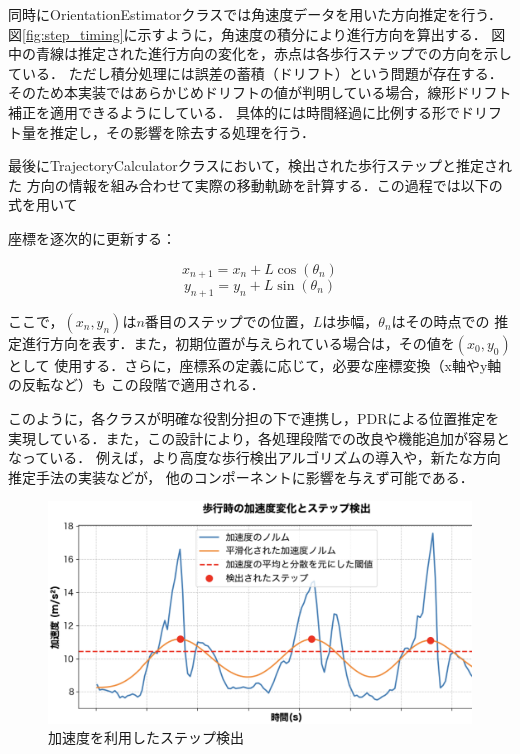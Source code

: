 同時にOrientationEstimatorクラスでは角速度データを用いた方向推定を行う．
図\ref{fig:step_timing}に示すように，角速度の積分により進行方向を算出する．
図中の青線は推定された進行方向の変化を，赤点は各歩行ステップでの方向を示している．
ただし積分処理には誤差の蓄積（ドリフト）という問題が存在する．
そのため本実装ではあらかじめドリフトの値が判明している場合，線形ドリフト補正を適用できるようにしている．
具体的には時間経過に比例する形でドリフト量を推定し，その影響を除去する処理を行う．

最後にTrajectoryCalculatorクラスにおいて，検出された歩行ステップと推定された
方向の情報を組み合わせて実際の移動軌跡を計算する．この過程では以下の式を用いて

座標を逐次的に更新する：

\begin{equation}
x_{n+1} = x_n + L \cos(\theta_n)
\end{equation}
\begin{equation}
y_{n+1} = y_n + L \sin(\theta_n)
\end{equation}

ここで，$(x_n, y_n)$は$n$番目のステップでの位置，$L$は歩幅，$\theta_n$はその時点での
推定進行方向を表す．また，初期位置が与えられている場合は，その値を$(x_0, y_0)$として
使用する．さらに，座標系の定義に応じて，必要な座標変換（x軸やy軸の反転など）も
この段階で適用される．

このように，各クラスが明確な役割分担の下で連携し，PDRによる位置推定を
実現している．また，この設計により，各処理段階での改良や機能追加が容易となっている．
例えば，より高度な歩行検出アルゴリズムの導入や，新たな方向推定手法の実装などが，
他のコンポーネントに影響を与えず可能である．


\begin{figure}[ht]
	\centering
	\includegraphics[width=\linewidth]{image/step_detect.jpg}
	\caption{加速度を利用したステップ検出}    \label{fig:step_detect}
\end{figure}


